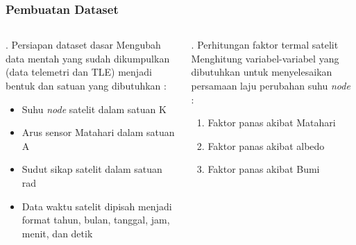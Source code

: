 \documentclass[8pt]{beamer}
\begin{document}
\begin{frame}
  \frametitle{Pembuatan Dataset}
  \begin{columns}[T]
    \begin{block}{. Persiapan dataset dasar}
      Mengubah data mentah yang sudah dikumpulkan (data telemetri dan TLE) menjadi bentuk dan satuan yang dibutuhkan :
      \begin{itemize}
        \item Suhu \textit{node} satelit dalam satuan K
        \item Arus sensor Matahari dalam satuan A
        \item Sudut sikap satelit dalam satuan rad
        \item Data waktu satelit dipisah menjadi format tahun, bulan, tanggal, jam, menit, dan detik
      \end{itemize}
    \end{block}
    \begin{block}{. Perhitungan faktor termal satelit}
      Menghitung variabel-variabel yang dibutuhkan untuk menyelesaikan persamaan laju perubahan suhu \textit{node} :
      \begin{enumerate}
        \item Faktor panas akibat Matahari
        \item Faktor panas akibat albedo
        \item Faktor panas akibat Bumi
      \end{enumerate}
    \end{block}
  \end{columns}
\end{frame}
\end{document}
